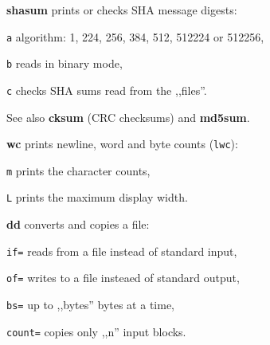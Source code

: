 \begin{enumx}
	\item [\cmdblack] \textbf{shasum} prints or checks SHA message digests:
	\item [\texttt{a}] algorithm: 1, 224, 256, 384, 512, 512224 or 512256,
	\item [\texttt{b}] reads in binary mode,
	\item [\texttt{c}] checks SHA sums read from the ,,files''.

	\item [\cmdblack] See also \textbf{cksum} (CRC checksums) and \textbf{md5sum}.
	\item [\cmdblack] \textbf{wc} prints newline, word and byte counts (\texttt{lwc}):
	\item [\texttt{m}] prints the character counts,
	\item [\texttt{L}] prints the maximum display width.
\end{enumx}

\begin{enumx}
	\item [\cmd] \textbf{dd} converts and copies a file:
	\item [\texttt{if=}] reads from a file instead of standard input,
	\item [\texttt{of=}] writes to a file insteaed of standard output,
	\item [\texttt{bs=}] up to ,,bytes'' bytes at a time,
	\item [\texttt{count=}] copies only ,,n'' input blocks.
\end{enumx}

